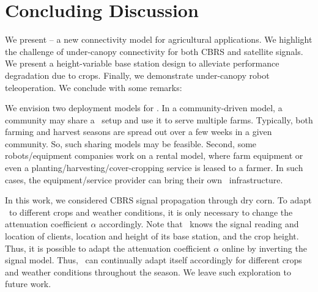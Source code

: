 \section{Concluding Discussion}
\label{sec:conclusion}
We present \name -- a new connectivity model for agricultural applications. We highlight the challenge of under-canopy connectivity for both CBRS and satellite signals. We present a height-variable base station design to alleviate performance degradation due to crops. Finally, we demonstrate under-canopy robot teleoperation. We conclude with some remarks:

We envision two deployment models for \name. In a community-driven model, a community may share a \name\ setup and use it to serve multiple farms. Typically, both farming and harvest seasons are spread out over a few weeks in a given community. So, such sharing models may be feasible. Second, some robots/equipment companies work on a rental model, where farm equipment or even a planting/harvesting/cover-cropping service is leased to a farmer. In such cases, the equipment/service provider can bring their own \name\ infrastructure. 

 In this work, we considered CBRS signal propagation through dry corn. To adapt \name\ to different crops and weather conditions, it is only necessary to change the attenuation coefficient $\alpha$ accordingly. Note that \name\ knows the signal reading and location of clients, location and height of its base station, and the crop height. Thus, it is possible to adapt the attenuation coefficient $\alpha$ online by inverting the signal model. Thus, \name\ can continually adapt itself accordingly for different crops and weather conditions throughout the season. We leave such exploration to future work.




\newcommand{\greencheck}{\textcolor{green}{\checkmark}}
\newcommand{\xmark}{\textcolor{red}{\ding{55}}}


